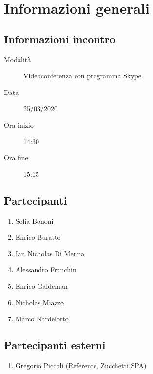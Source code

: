 \documentclass{article}
\begin{document}


\section{Informazioni generali}%
\label{sec:informazioni_generali}

\subsection{Informazioni incontro}%
\label{sub:informazioni_incontro}

\begin{description}
  \item[Modalità] Videoconferenza con programma Skype
  \item[Data] 25/03/2020
  \item[Ora inizio] 14:30
  \item[Ora fine] 15:15
\end{description}

\subsection{Partecipanti}%
\label{sub:partecipanti}

\begin{enumerate}
  \item Sofia Bononi
  \item Enrico Buratto
  \item Ian Nicholas Di Menna
  \item Alessandro Franchin
  \item Enrico Galdeman
  \item Nicholas Miazzo
  \item Marco Nardelotto
\end{enumerate}

\subsection{Partecipanti esterni}%
\label{sub:partecipanti esterni}

\begin{enumerate}
    \item Gregorio Piccoli (Referente, Zucchetti SPA)
\end{enumerate}
\end{document}
